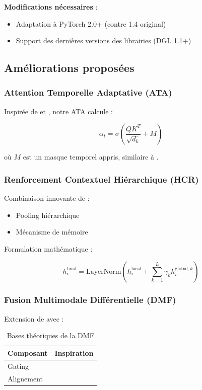 \documentclass[a4paper,11pt]{article}
\begin{document}
\textbf{Modifications nécessaires} :
\begin{itemize}
    \item Adaptation à PyTorch 2.0+ (contre 1.4 original)
    \item Support des dernières versions des librairies (DGL 1.1+)
\end{itemize}

\subsection{Améliorations proposées}
\subsubsection{Attention Temporelle Adaptative (ATA)}
Inspirée de \cite{vaswani2017attention} et \cite{velickovic2017graph}, notre ATA calcule :

\[
\alpha_t = \sigma\left(\frac{QK^T}{\sqrt{d_k}} + M\right)
\]

où $M$ est un masque temporel appris, similaire à \cite{beltagy2020longformer}.

\subsubsection{Renforcement Contextuel Hiérarchique (HCR)}
Combinaison innovante de :
\begin{itemize}
    \item Pooling hiérarchique \cite{yao2019graph}
    \item Mécanisme de mémoire \cite{sukhbaatar2015end}
\end{itemize}

Formulation mathématique :

\[
h_i^{\text{final}} = \text{LayerNorm}(h_i^{\text{local}} + \sum_{k=1}^L \gamma_k h_i^{\text{global},k})
\]

\subsubsection{Fusion Multimodale Différentielle (DMF)}
Extension de \cite{zadeh2018memory} avec :

\begin{table}[h]
\centering
\begin{tabular}{ll}
\toprule
Composant & Inspiration \\
\midrule
Gating & \cite{jaegle2021perceiver} \\
Alignement & \cite{alayrac2022self} \\
\bottomrule
\end{tabular}
\caption{Bases théoriques de la DMF}
\label{tab:dmf_sources}
\end{table}
\end{document}
